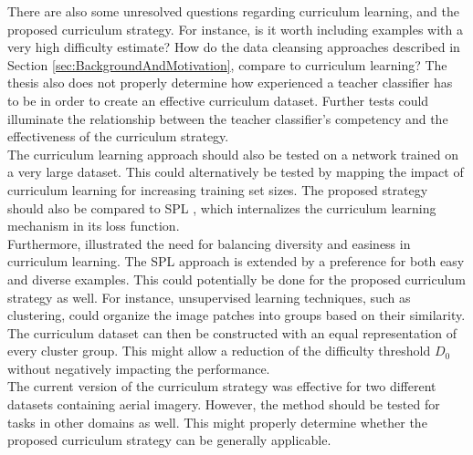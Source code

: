 There are also some unresolved questions regarding curriculum learning, and the proposed curriculum strategy. For instance, is it worth including examples with a very high difficulty estimate? How do the data cleansing approaches described in Section \ref{sec:BackgroundAndMotivation}, compare to curriculum learning? The thesis also does not properly determine how experienced a teacher classifier has to be in order to create an effective curriculum dataset. Further tests could illuminate the relationship between the teacher classifier's competency and the effectiveness of the curriculum strategy.  \\

The curriculum learning approach should also be tested on a network trained on a very large dataset. This could alternatively be tested by mapping the impact of curriculum learning for increasing training set sizes. The proposed strategy should also be compared to \ac{SPL} \citep{Kumar_self_paced_learning}, which internalizes the curriculum learning mechanism in its loss function.\\

Furthermore, \cite{Lu_self-paced_learning_diversity} illustrated the need for balancing diversity and easiness in curriculum learning. The \ac{SPL} approach is extended by a preference for both easy and diverse examples. This could potentially be done for the proposed curriculum strategy as well. For instance, unsupervised learning techniques, such as clustering, could organize the image patches into groups based on their similarity. The curriculum dataset can then be constructed with an equal representation of every cluster group. This might allow a reduction of the difficulty threshold $D_0$ without negatively impacting the performance.\\

The current version of the curriculum strategy was effective for two different datasets containing aerial imagery. However, the method should be tested for tasks in other domains as well. This might properly determine whether the proposed curriculum strategy can be generally applicable.\\
 

